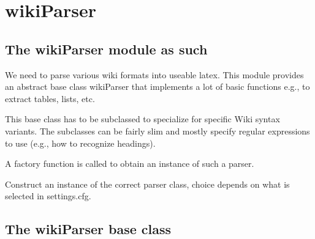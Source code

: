 \documentclass[a4paper,10pt,english]{sphinxmanual}
\begin{document}
\section{wikiParser}
\label{sourcecodedoc:wikiparser}

\subsection{The wikiParser module as such}
\label{sourcecodedoc:the-wikiparser-module-as-such}\label{sourcecodedoc:module-wikiParser}
We need to parse various wiki formats into useable latex. This module
provides an abstract base class wikiParser that implements a lot of
basic functions e.g.,  to extract tables, lists, etc.

This base class has to be subclassed to specialize for specific Wiki
syntax variants. The subclasses can be fairly slim and mostly specify
regular expressions to use (e.g., how to recognize headings).

A factory function is called to obtain an instance of such a parser.

\begin{fulllineitems}
\label{sourcecodedoc:wikiParser.wikiParserFactory}
Construct an instance of the correct parser class, choice depends on what is
selected in settings.cfg.

\end{fulllineitems}



\subsection{The wikiParser base class}
\label{sourcecodedoc:the-wikiparser-base-class}
\end{document}
